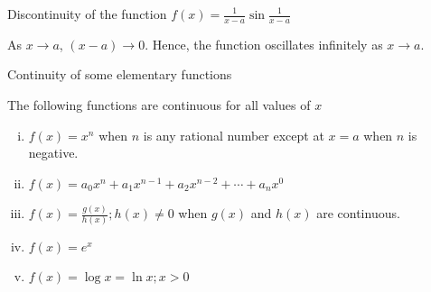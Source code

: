 \begin{example}{Discontinuity of the function $f(x) = \frac{1}{x-a}\sin{\frac{1}{x-a}}$}
    
    As $x \to a$, $(x-a) \to 0$. Hence, the function oscillates infinitely as $x \to a$.
\end{example}


\begin{theorem}{Continuity of some elementary functions}
    
    The following functions are continuous for all values of $x$ 
    \begin{enumerate}[(i)]
        \item $f(x) = x^n$ when $n$ is any rational number except at $x=a$ when $n$ is negative.
        \item $f(x) = a_0x^n + a_1x^{n-1} + a_2x^{n-2} + \cdots + a_nx^0$
        \item $f(x) = \frac{g(x)}{h(x)} ; h(x) \neq 0$ when $g(x)$ and $h(x)$ are continuous.
        \item $f(x)=e^x$
        \item $f(x)=\log{x}=\ln{x}; x>0$
    \end{enumerate}
\end{theorem}
